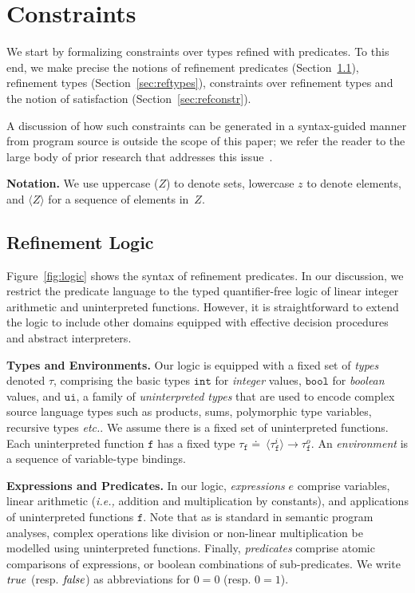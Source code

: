 \documentclass[nocopyrightspace]{sigplanconf}
\newcommand{\defeq}{\doteq\ }
\def\mypara#1{\smallskip\noindent\textbf{#1}}
\newcommand{\ie}{\textit{i.e.,}\xspace}
\def\etc{{\it etc.}}
\def\true{{\it true}}
\def\false{{\it false}}
\newcommand{\ttf}{\mathtt{f}}
\def\zug#1{{\langle #1 \rangle}}
\newcommand{\mybar}[1]{\zug{#1}}
\def\ttunint{\mathtt{ui}}
\def\ttint{\mathtt{int}}
\def\ttbool{\mathtt{bool}}
\newcommand{\typ}{\tau}
\begin{document}
\section{Constraints}\label{sec:constraints}

We start by formalizing constraints over types refined with predicates. 
To this end, we make precise the notions of 
refinement predicates (Section~\ref{sec:logic}),
refinement types 
(Section~\ref{sec:reftypes}),
constraints over refinement types 
and the notion of satisfaction 
(Section~\ref{sec:refconstr}).

A discussion of how such constraints can be generated in a syntax-guided
manner from program source
is outside the scope of this paper; we refer the reader to the large body
of prior research that addresses this 
issue~\cite{XiPfenning99,Knowles07,LiquidPLDI08,GordonRefinement09}.

\mypara{Notation.}
We use uppercase ($Z$) to denote sets, lowercase $z$ to denote
elements, and $\mybar{Z}$ for a sequence of elements in~$Z$. 

\subsection{Refinement Logic}
\label{sec:logic}

Figure~\ref{fig:logic} shows the syntax of refinement predicates. 
In our discussion, we restrict the predicate language to the typed quantifier-free
logic of linear integer arithmetic and uninterpreted functions.
However, it is straightforward to extend the logic to include 
other domains equipped with effective decision procedures 
and abstract interpreters.

\mypara{Types and Environments.}
Our logic is equipped with a fixed 
set of \emph{types} denoted $\typ$, 
comprising the basic types
$\ttint$ for \emph{integer} values, 
$\ttbool$ for \emph{boolean} values,
and $\ttunint$, a family of \emph{uninterpreted types} that are used to
encode complex source language types such as products, sums, polymorphic 
type variables, recursive types \etc.
We assume there is a fixed set of uninterpreted functions.
Each uninterpreted function $\ttf$ has a fixed type 
$\typ_\ttf \defeq \mybar{\typ^i_\ttf} \rightarrow \typ^o_\ttf$.
An \emph{environment} is a sequence of variable-type bindings.

\mypara{Expressions and Predicates.}
In our logic, \emph{expressions} $e$ comprise variables, linear arithmetic
(\ie addition and multiplication by constants), and applications of 
uninterpreted functions $\ttf$. 
Note that as is standard in semantic program analyses, complex
operations like division or non-linear multiplication be modelled using 
uninterpreted functions.
Finally, \emph{predicates} comprise atomic comparisons of expressions, or
boolean combinations of sub-predicates.
We write $\true$ (resp. $\false$) as abbreviations for $0=0$ (resp. $0=1$).
\end{document}
